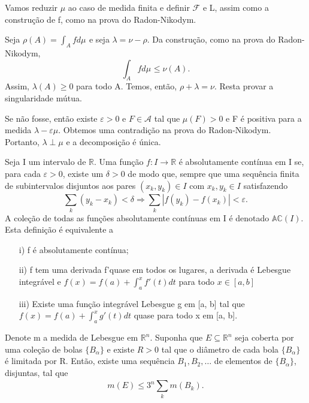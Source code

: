 \documentclass[measure_theory.tex]{subfiles}
\begin{document}
\begin{proof*}
	Vamos reduzir \(\mu \) ao caso de medida finita e definir \(\mathcal{F}\) e L, assim como a construção de f, como na prova do Radon-Nikodym.

	Seja \(\rho (A) = \int_{A}f d\mu_{}\) e seja \(\lambda = \nu - \rho\). Da construção, como na prova do Radon-Nikodym,
	\[
		\int_{A}f d\mu_{}\leq \nu (A).
	\]
	Assim, \(\lambda (A) \geq 0\) para todo A. Temos, então, \(\rho + \lambda = \nu \). Resta provar a singularidade mútua.

	Se não fosse, então existe \(\varepsilon > 0\) e \(F\in \mathcal{A}\) tal que \(\mu (F) > 0\) e F é positiva para a medida \(\lambda -\varepsilon \mu .\) Obtemos uma contradição na prova do Radon-Nikodym. Portanto, \(\lambda \perp \mu \) e a decomposição é única. \qedsymbol
\end{proof*}
Seja I um intervalo de \(\mathbb{R}.\) Uma função \(f:I\rightarrow \mathbb{R}\) é absolutamente contínua em I se, para cada \(\varepsilon  > 0\), existe um \(\delta > 0\) de modo que, sempre que uma sequência finita de subintervalos disjuntos aos pares \((x_{k}, y_{k})\in I\) com \(x_{k}, y_{k}\in I\) satisfazendo
\[
	\sum\limits_{k}^{}(y_{k}-x_{k}) < \delta \Rightarrow \sum\limits_{k}^{}|f(y_{k}) - f(x_{k})| < \varepsilon .
\]
A coleção de todas as funções absolutamente contínuas em I é denotado \(\mathbb{AC}(I).\) Esta definição é equivalente a
\begin{itemize}
	\item[i)] f é absolutamente contínua;
	\item[ii)] f tem uma derivada f'quase em todos os lugares, a derivada é Lebesgue integrável e \(f(x) = f(a) + \int_{a}^{x}f'(t)dt\) para todo \(x\in [a, b]\)
	\item[iii)] Existe uma função integrável Lebesgue g em [a, b] tal que \(f(x) = f(a) + \int_{a}^{x}g'(t)dt\) quase para todo x em [a, b].
\end{itemize}
\begin{lemma*}
	Denote m a medida de Lebesgue em \(\mathbb{R}^{n}.\) Suponha que \(E\subseteq \mathbb{R}^{n}\) seja coberta por uma coleção de bolas \(\{B_{\alpha }\} \) e existe \(R> 0\) tal que o diâmetro de cada bola \(\{B_{\alpha }\}\) é limitada por R.
	Então, existe uma sequência \(B_{1}, B_{2}, \dotsc \) de elementos de \(\{B_{\alpha }\}\), disjuntas, tal que
	\[
		m(E) \leq 3^{n}\sum\limits_{k}^{}m(B_{k}).
	\]
\end{lemma*}
\end{document}
